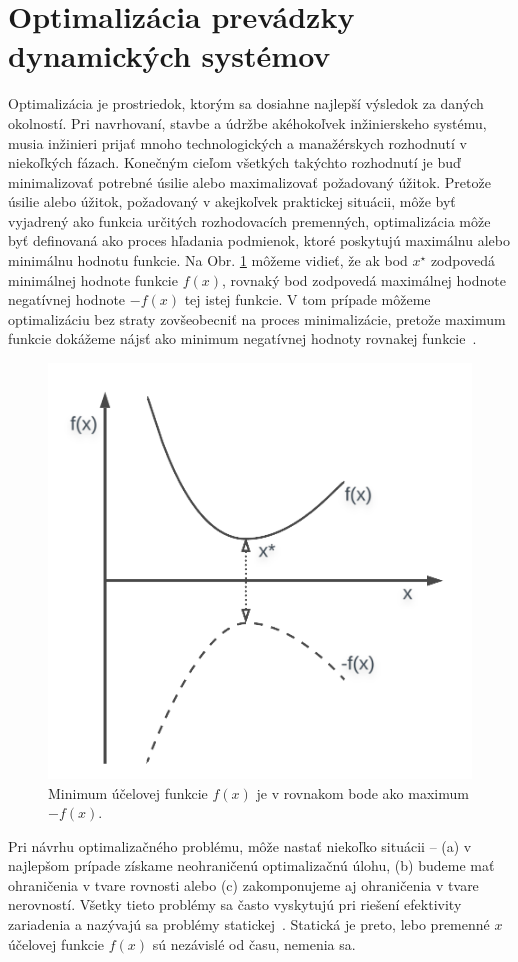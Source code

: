\section{Optimalizácia prevádzky dynamických systémov}
Optimalizácia je prostriedok, ktorým sa dosiahne najlepší výsledok za daných okolností. Pri navrhovaní, stavbe a údržbe akéhokoľvek inžinierskeho systému, musia inžinieri prijať mnoho technologických a manažérskych rozhodnutí v niekoľkých fázach. Konečným cieľom všetkých takýchto rozhodnutí je buď minimalizovať potrebné úsilie alebo maximalizovať požadovaný úžitok. Pretože úsilie alebo úžitok, požadovaný v akejkoľvek praktickej situácii, môže byť vyjadrený ako funkcia určitých rozhodovacích premenných, optimalizácia môže byť definovaná ako proces hľadania podmienok, ktoré poskytujú maximálnu alebo minimálnu hodnotu funkcie. Na Obr. \ref{fig:cost_fun_ex} môžeme vidieť, že ak bod $ x^{\star} $ zodpovedá minimálnej hodnote funkcie $ f(x) $, rovnaký bod zodpovedá maximálnej hodnote negatívnej hodnote $ -f(x) $ tej istej funkcie. V tom prípade môžeme optimalizáciu bez straty zovšeobecniť na proces minimalizácie, pretože maximum funkcie dokážeme nájsť ako minimum negatívnej hodnoty rovnakej funkcie~\cite{rao:intro_engin_opt:2009}. 

\begin{figure}
	\centering
	\includegraphics[width=0.5\linewidth]{images/optimization_obj}
	\caption{Minimum účelovej funkcie $ f(x) $ je v rovnakom bode ako maximum $ -f(x) $.}
	\label{fig:cost_fun_ex}
\end{figure}

Pri návrhu optimalizačného problému, môže nastať niekoľko situácii -- (a) v najlepšom prípade získame neohraničenú optimalizačnú úlohu, (b) budeme mať ohraničenia v tvare rovnosti alebo (c) zakomponujeme aj ohraničenia v tvare nerovností. Všetky tieto problémy sa často vyskytujú pri riešení efektivity zariadenia a nazývajú sa problémy statickej~\cite{agrawal:static_opt:1999}. Statická je preto, lebo premenné $ x $ účelovej funkcie $ f(x) $ sú nezávislé od času, nemenia sa. 

